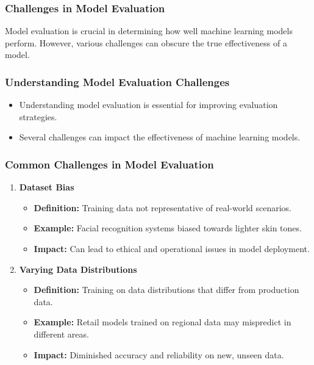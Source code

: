 \documentclass[aspectratio=169]{beamer}
\begin{document}
\begin{frame}[fragile]
    \frametitle{Challenges in Model Evaluation}
    Model evaluation is crucial in determining how well machine learning models perform. However, various challenges can obscure the true effectiveness of a model. 
\end{frame}

\begin{frame}[fragile]
    \frametitle{Understanding Model Evaluation Challenges}
    \begin{itemize}
        \item Understanding model evaluation is essential for improving evaluation strategies.
        \item Several challenges can impact the effectiveness of machine learning models.
    \end{itemize}    
\end{frame}

\begin{frame}[fragile]
    \frametitle{Common Challenges in Model Evaluation}
    \begin{enumerate}
        \item \textbf{Dataset Bias}
            \begin{itemize}
                \item \textbf{Definition:} Training data not representative of real-world scenarios.
                \item \textbf{Example:} Facial recognition systems biased towards lighter skin tones.
                \item \textbf{Impact:} Can lead to ethical and operational issues in model deployment.
            \end{itemize}
        
        \item \textbf{Varying Data Distributions}
            \begin{itemize}
                \item \textbf{Definition:} Training on data distributions that differ from production data.
                \item \textbf{Example:} Retail models trained on regional data may mispredict in different areas.
                \item \textbf{Impact:} Diminished accuracy and reliability on new, unseen data.
            \end{itemize}
    \end{enumerate}
\end{frame}
\end{document}

